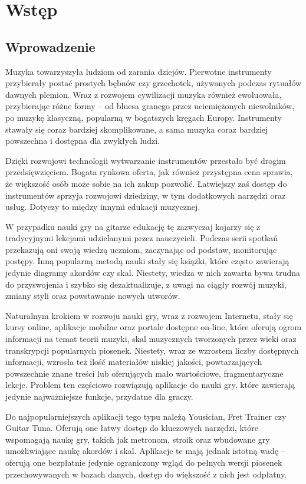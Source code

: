 \chapter{Wstęp}
\section{Wprowadzenie}
Muzyka towarzyszyła ludziom od zarania dziejów. Pierwotne instrumenty przybierały postać prostych bębnów czy grzechotek, używanych podczas rytuałów dawnych plemion. Wraz z rozwojem cywilizacji muzyka również ewoluowała, przybierając różne formy – od bluesa granego przez uciemiężonych niewolników, po muzykę klasyczną, popularną w bogatszych kręgach Europy. Instrumenty stawały się coraz bardziej skomplikowane, a sama muzyka coraz bardziej powszechna i dostępna dla zwykłych ludzi.

Dzięki rozwojowi technologii wytwarzanie instrumentów przestało być drogim przedsięwzięciem. Bogata rynkowa oferta, jak również przystępna cena sprawia, że większość osób może sobie na ich zakup pozwolić. Łatwiejszy zaś dostęp do instrumentów sprzyja rozwojowi dziedziny, w tym dodatkowych narzędzi oraz usług.
Dotyczy to między innymi edukacji muzycznej.

W przypadku nauki gry na gitarze edukację tę zazwyczaj kojarzy się z tradycyjnymi lekcjami udzielanymi przez nauczycieli. Podczas serii spotkań przekazują oni swoją wiedzą uczniom, zaczynając od podstaw, monitorując postępy. Inną popularną metodą nauki stały się książki, które często zawierają jedynie diagramy akordów czy skal. Niestety, wiedza w nich zawarta bywa trudna do przyswojenia i szybko się dezaktualizuje, z uwagi na ciągły rozwój muzyki, zmiany styli oraz powstawanie nowych utworów.

Naturalnym krokiem w rozwoju nauki gry, wraz z rozwojem Internetu, stały się kursy online, aplikacje mobilne oraz portale dostępne on-line, które oferują ogrom informacji na temat teorii muzyki, skal muzycznych tworzonych przez wieki oraz transkrypcji popularnych piosenek. Niestety, wraz ze wzrostem liczby dostępnych informacji, wzrosła też ilość materiałów niskiej jakości, powtarzających powszechnie znane treści lub oferujących mało wartościowe, fragmentaryczne lekcje. Problem ten częściowo rozwiązują aplikacje do nauki gry, które zawierają jedynie najważniejsze funkcje, przydatne dla graczy.

Do najpopularniejszych aplikacji tego typu należą Yousician, Fret Trainer czy Guitar Tuna. Oferują one łatwy dostęp do kluczowych narzędzi, które wspomagają naukę gry, takich jak metronom, stroik oraz wbudowane gry umożliwiające naukę akordów i skal. Aplikacje te mają jednak istotną wadę – oferują one bezpłatnie jedynie ograniczony wgląd do pełnych wersji piosenek przechowywanych w bazach danych, dostęp do większość z nich jest odpłatny.


